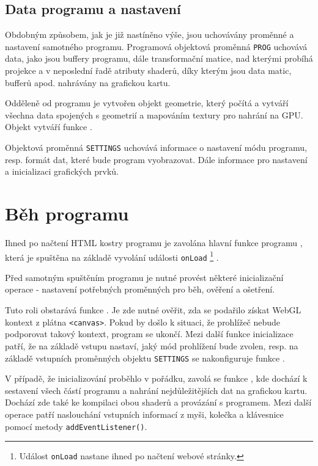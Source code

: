\newpage

\subsection{Data programu a nastavení}
Obdobným způsobem, jak je již nastíněno výše, jsou uchovávány proměnné a nastavení samotného programu. Programová objektová proměnná \texttt{PROG} uchovává data, jako jsou buffery programu, dále transformační matice, nad kterými probíhá projekce a v neposlední řadě atributy shaderů, díky kterým jsou data matic, bufferů apod. nahrávány na grafickou kartu. 

Odděleně od programu je vytvořen objekt geometrie, který počítá a vytváří všechna data spojených s geometrií a mapováním textury pro nahrání na GPU. Objekt vytváří funkce \texttt{\createSphereGeometry}.

Objektová proměnná \texttt{SETTINGS} uchovává informace o nastavení módu programu, resp. formát dat, které bude program vyobrazovat. Dále informace pro nastavení a inicializaci grafických prvků.


\section{Běh programu}
Ihned po načtení HTML kostry programu je zavolána hlavní funkce programu \texttt{\main}, která je spuštěna  na základě vyvolání události \texttt{onLoad} \footnote{ Událost \texttt{onLoad} nastane ihned po načtení webové stránky.} .

Před samotným spuštěním programu je nutné provést některé inicializační operace - nastavení potřebných proměnných pro běh, ověření a ošetření. 

Tuto roli obstarává funkce \texttt{\initProgram}. Je zde nutné ověřit, zda se podařilo získat WebGL kontext z plátna \texttt{<canvas>}. Pokud by došlo k situaci, že prohlížeč nebude podporovat takový kontext, program se ukončí. Mezi další funkce inicializace patří, že na základě vstupu nastaví, jaký mód prohlížení bude zvolen, resp. na základě vstupních proměnných objektu \texttt{SETTINGS}  se nakonfiguruje funkce \texttt{\createSphereGeometry}. 

V případě, že inicializování proběhlo v pořádku, zavolá se funkce \texttt{\setupProgram}, kde dochází k sestavení všech částí programu a nahrání nejdůležitějších dat na grafickou kartu. Dochází zde také ke kompilaci obou shaderů a provázání s programem. Mezi další operace patří naslouchání vstupních informací z myši, kolečka a klávesnice pomocí metody \texttt{addEventListener()}.

